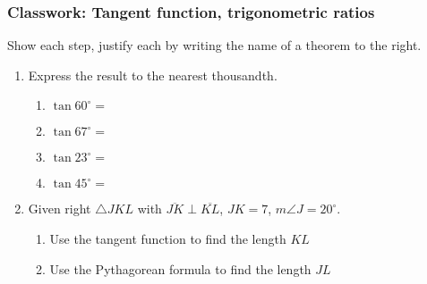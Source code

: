 \documentclass[12pt, oneside]{article}
\begin{document}
\subsubsection*{Classwork: Tangent function, trigonometric ratios}
Show each step, justify each by writing the name of a theorem to the right.  \begin{enumerate}

    \item Express the result to the nearest thousandth.  \vspace{.5cm}
      \begin{multicols}{2}
        \begin{enumerate}
          \item $\tan 60^\circ = $ \vspace{1cm}
          \item $\tan 67^\circ =$
          \item $\tan 23^\circ = $ \vspace{1cm}
          \item $\tan 45^\circ =$
        \end{enumerate}
      \end{multicols} \vspace{1cm}

      \item Given right $\triangle JKL$ with $\overline{JK} \perp \overline{KL}$, $JK=7$, $m\angle J=20^\circ$.
      \begin{flushright}
         \vspace{1cm}
      \end{flushright}
      \begin{enumerate}
        \item Use the tangent function to find the length $KL$\\[3cm]
        \item Use the Pythagorean formula to find the length $JL$\\[3cm]


\end{enumerate}
\end{enumerate}
\end{document}
